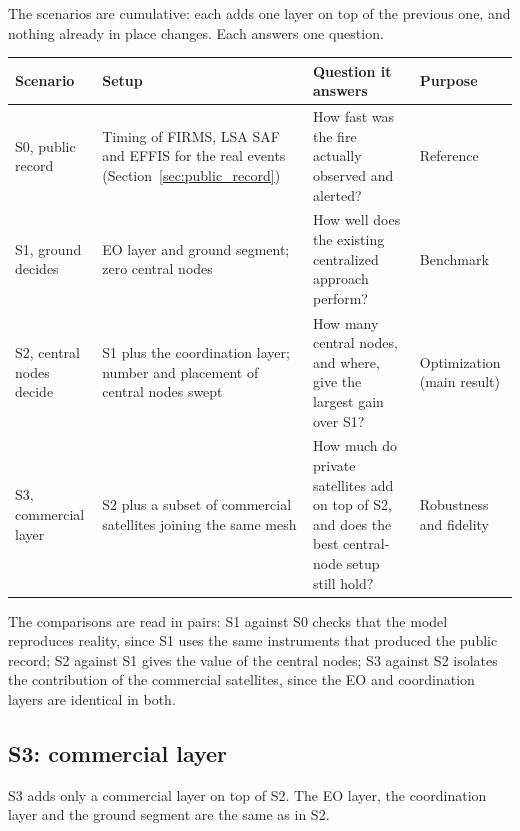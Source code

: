 \documentclass[11pt]{article}
\begin{document}
The scenarios are cumulative: each adds one layer on top of the previous one, and nothing already in place changes. Each answers one question.

\begin{longtable}{p{2.6cm}p{4.3cm}p{5.0cm}p{2.4cm}}
\toprule
\textbf{Scenario} & \textbf{Setup} & \textbf{Question it answers} & \textbf{Purpose} \\
\midrule
\endhead
S0, public record & Timing of FIRMS, LSA SAF and EFFIS for the real events (Section~\ref{sec:public_record}) & How fast was the fire actually observed and alerted? & Reference \\
S1, ground decides & EO layer and ground segment; zero central nodes & How well does the existing centralized approach perform? & Benchmark \\
S2, central nodes decide & S1 plus the coordination layer; number and placement of central nodes swept & How many central nodes, and where, give the largest gain over S1? & Optimization (main result) \\
S3, commercial layer & S2 plus a subset of commercial satellites joining the same mesh & How much do private satellites add on top of S2, and does the best central-node setup still hold? & Robustness and fidelity \\
\bottomrule
\end{longtable}

The comparisons are read in pairs: S1 against S0 checks that the model reproduces reality, since S1 uses the same instruments that produced the public record; S2 against S1 gives the value of the central nodes; S3 against S2 isolates the contribution of the commercial satellites, since the EO and coordination layers are identical in both.

\subsection{S3: commercial layer}\label{subsec:s3}

S3 adds only a commercial layer on top of S2. The EO layer, the coordination layer and the ground segment are the same as in S2.
\end{document}
